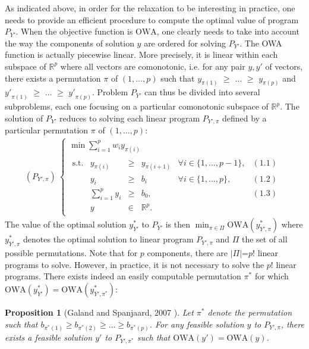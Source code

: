 \documentclass[final,3p,times]{elsarticle}
\newcommand{\owa}{\mbox{OWA}}
\newcommand{\RP}{\mathbb{R}^p}
\newtheorem{prop}{\bf Proposition}
\begin{document}
As indicated above, in order for the relaxation to be interesting in practice, one needs to provide an efficient procedure
to compute the optimal value of program $P_{Y'}$. When the objective function is $\owa$, one clearly needs to take into account the way
the components of solution $y$ are ordered for solving $P_{Y'}$. The OWA
function is actually piecewise linear. More precisely, it is linear
within each subspace of $\RP$ where all vectors are comonotonic,
i.e. for any pair $y,y'$ of vectors, there exists a permutation $\pi$
of $(1,\ldots,p)$ such that $y_{\pi(1)}$ $\geq$ $\ldots$ $\geq$
$y_{\pi(p)}$ and ${y'}_{\pi(1)}$ $\geq$ $\ldots$ $\geq$
${y'}_{\pi(p)}$. Problem $P_{Y'}$ can thus be divided into several
subproblems, each one focusing on a particular comonotonic subspace of
$\RP$. The solution of $P_{Y'}$ reduces to solving each linear program $P_{Y',\pi}$
defined by a particular permutation $\pi$ of $(1,\ldots,p)$:  
\vspace{-0.15cm}   
\begin{eqnarray*} (P_{Y',\pi}) \ \left \{ \begin{array}{ll}
\min\sum_{i=1}^p w_i y_{\pi(i)}  \\
\begin{array}{rrclllr}
\mbox{s.t.} & y_{\pi(i)} & \geq & y_{\pi(i+1)} & \forall i\in\{1,\ldots,p-1\}, &(1.1)\\
& y_i & \geq & b_i & \forall i\in\{1,\ldots,p\}, &(1.2)\\
& \sum_{i=1}^p y_i & \geq & b_0, & &(1.3)\\
& y & \in & \mathbb{R}^p.
\end{array}
\end{array} \right.
\end{eqnarray*} 
The value of the optimal solution $y^*_{Y'}$ to $P_{Y'}$ is then $\min_{\pi \in \Pi}
\owa(y^*_{Y',\pi})$ where $y^*_{Y',\pi}$ denotes the optimal
solution to linear program $P_{Y',\pi}$ and $\Pi$ the set of all
possible permutations. Note that for $p$ components, there are
$|\Pi|$=$p!$ linear programs to solve. However, in practice, it is not
necessary to solve the $p!$ linear programs. There exists indeed an
easily computable permutation $\pi^*$ for which $\owa(y^*_{Y'}) =
\owa(y^*_{Y',\pi^*})$: 

\begin{prop}[Galand and Spanjaard, 2007 \cite{GalaS07}]\label{PROP1}
  Let $\pi^*$ denote the permutation such that $b_{\pi^*(1)} \ge
  b_{\pi^*(2)} \ge \ldots \ge b_{\pi^*(p)}$. For any feasible
  solution $y$ to $P_{Y',\pi}$, there exists a feasible solution $y'$
  to $P_{Y',\pi^*}$ such that $\owa(y') = \owa(y)$.
\end{prop}
\end{document}
